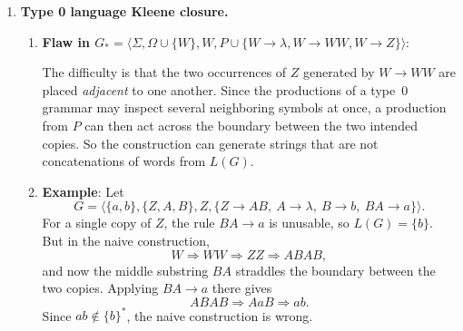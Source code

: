 \begin{enumerate}[{11.}1. ]
\textbf{Base case} ($k=0$): The initial configuration is exactly
$s_0\pmb{a}x\pmb{b}$, and its encoding is
$\overline{\pmb{a}}_0x\underline{\pmb{b}}$.

\textbf{Induction step}: Assume the claim for $k$. If
\[
s_0\pmb{a}x\pmb{b} \Dvdash^{k+1} C',
\]
choose $C$ with
\[
s_0\pmb{a}x\pmb{b} \Dvdash^k C \Dvdash C'.
\]
By the induction hypothesis,
\[
\overline{\pmb{a}}_0x\underline{\pmb{b}} \DRightarrow^k \phi(C).
\]
Definition~11.9 gives one class~2 production for each possible move of the
strict LBA, including the boundary cases where the scanned symbol is marked with
an overbar or underline. Hence the last move $C\Dvdash C'$ is mirrored by one
derivation step $\phi(C)\DRightarrow\phi(C')$. The converse direction is the
same, since every class~2 production encodes a legal move of $B$ and nothing
else. This is the induction statement needed in the proof of
Theorem~11.5. \qed

\item \textbf{Type 0 language Kleene closure.}

\begin{enumerate}
\item \textbf{Flaw in $G_* = \langle\Sigma,\Omega\cup\{W\},W,P\cup\{W\to\lambda,W\to WW,W\to Z\}\rangle$}:

The difficulty is that the two occurrences of $Z$ generated by $W\to WW$ are
placed \emph{adjacent} to one another. Since the productions of a type~0 grammar
may inspect several neighboring symbols at once, a production from $P$ can then
act across the boundary between the two intended copies. So the construction can
generate strings that are not concatenations of words from $L(G)$.

\item \textbf{Example}: Let
\[
G=\langle\{a,b\},\{Z,A,B\},Z,\{Z\to AB,\ A\to\lambda,\ B\to b,\ BA\to a\}\rangle.
\]
For a single copy of $Z$, the rule $BA\to a$ is unusable, so $L(G)=\{b\}$. But in
the naive construction,
\[
W\Rightarrow WW\Rightarrow ZZ\Rightarrow ABAB,
\]
and now the middle substring $BA$ straddles the boundary between the two copies.
Applying $BA\to a$ there gives
\[
ABAB\Rightarrow AaB\Rightarrow ab.
\]
Since $ab\notin\{b\}^*$, the naive construction is wrong.


\end{enumerate}
\end{enumerate}
